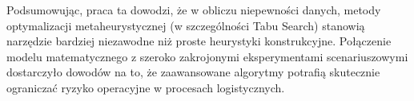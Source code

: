 Podsumowując, praca ta dowodzi, że w obliczu niepewności danych, metody optymalizacji metaheurystycznej (w szczególności Tabu Search) stanowią narzędzie bardziej niezawodne niż proste heurystyki konstrukcyjne. Połączenie modelu matematycznego z szeroko zakrojonymi eksperymentami scenariuszowymi dostarczyło dowodów na to, że zaawansowane algorytmy potrafią skutecznie ograniczać ryzyko operacyjne w procesach logistycznych.


















































